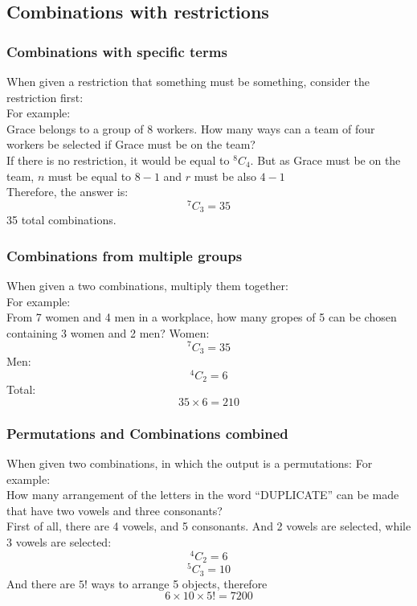 \documentclass[a4paper,10pt]{report}
\newcommand{\Comb}[2]{{}^{#1}C_{#2}}
\newenvironment{example}{For example:\\}{}
\begin{document}
\subsection{Combinations with restrictions}
\subsubsection{Combinations with specific terms}
When given a restriction that something must be something, consider the restriction first:\\
\begin{example}
	Grace belongs to a group of 8 workers.  How many ways can a team of four workers be selected if Grace must be on the team?\\
	If there is no restriction, it would be equal to $\Comb{8}{4}$.  But as Grace must be on the team, $n$ must be equal to $8 - 1$ and $r$ must be also $4 - 1$\\
	Therefore, the answer is:
	$$
		\Comb{7}{3} = 35
	$$
	35 total combinations.
\end{example}

\subsubsection{Combinations from multiple groups}
When given a two combinations, multiply them together:\\
\begin{example}
	From 7 women and 4 men in a workplace, how many gropes of 5 can be chosen containing 3 women and 2 men?
	Women:
	$$
		\Comb{7}{3} = 35
	$$
	Men:
	$$
		\Comb{4}{2} = 6
	$$
	Total:
	$$
		35 \times 6 = 210
	$$
\end{example}

\subsubsection{Permutations and Combinations combined}
When given two combinations, in which the output is a permutations:
\begin{example}
	How many arrangement of the letters in the word ``DUPLICATE'' can be made that have two vowels and three consonants?\\

	First of all, there are 4 vowels, and 5 consonants.  And 2 vowels are selected, while 3 vowels are selected:
	$$
		\Comb{4}{2} = 6
	$$
	$$
		\Comb{5}{3} = 10
	$$
	And there are $5!$ ways to arrange 5 objects, therefore
	$$
		6 \times 10 \times 5! = 7200
	$$
\end{example}
\end{document}
